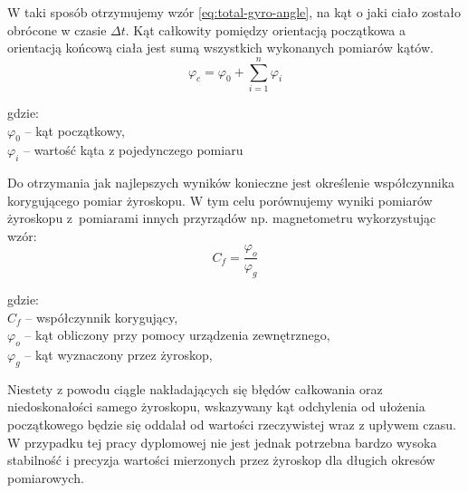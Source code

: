 W taki sposób otrzymujemy wzór \ref{eq:total-gyro-angle}, na kąt o jaki ciało
zostało obrócone w czasie $\Delta t$. Kąt całkowity pomiędzy orientacją początkowa a orientacją
końcową ciała jest sumą wszystkich wykonanych pomiarów kątów.
\begin{equation}
  \label{eq:total-gyro-angle}
  \varphi_{c} = \varphi_{0} + \sum_{i=1}^{n} \varphi_{i} 
\end{equation}
\begin{tabbing}
  gdzie: \= \\
    \> $\varphi_{0}$ -- kąt początkowy,\\
    \> $\varphi_{i}$ -- wartość kąta z pojedynczego pomiaru\\
\end{tabbing}
Do otrzymania jak najlepszych wyników konieczne jest określenie współczynnika korygującego pomiar żyroskopu.
W tym celu porównujemy wyniki pomiarów żyroskopu z~pomiarami innych przyrządów np. magnetometru wykorzystując wzór:
\begin{equation}
  C_{f} = \frac{\varphi_{o}}{\varphi_{g}}
\end{equation}
\begin{tabbing}
  gdzie: \= \\
    \> $C_{f}$ -- współczynnik korygujący, \\
    \> $\varphi_{o}$ -- kąt obliczony przy pomocy urządzenia zewnętrznego,\\
    \> $\varphi_{g}$ -- kąt wyznaczony przez żyroskop,\\
\end{tabbing}

Niestety z powodu ciągle nakładających się błędów całkowania oraz niedoskonałości
samego żyroskopu, wskazywany kąt odchylenia od ułożenia początkowego będzie się
oddalał od wartości rzeczywistej wraz z upływem czasu. W przypadku tej pracy
dyplomowej nie jest jednak potrzebna bardzo wysoka stabilność i precyzja wartości
mierzonych przez żyroskop dla długich okresów pomiarowych.

